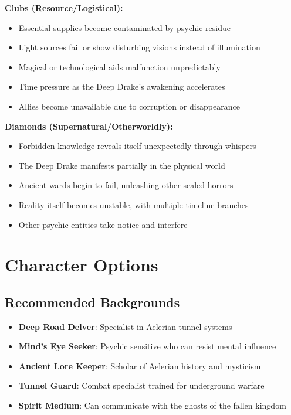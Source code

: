 \documentclass[11pt]{article}
\begin{document}
\textbf{Clubs (Resource/Logistical):}
\begin{itemize}
\item Essential supplies become contaminated by psychic residue
\item Light sources fail or show disturbing visions instead of illumination
\item Magical or technological aids malfunction unpredictably
\item Time pressure as the Deep Drake's awakening accelerates
\item Allies become unavailable due to corruption or disappearance
\end{itemize}

\textbf{Diamonds (Supernatural/Otherworldly):}
\begin{itemize}
\item Forbidden knowledge reveals itself unexpectedly through whispers
\item The Deep Drake manifests partially in the physical world
\item Ancient wards begin to fail, unleashing other sealed horrors
\item Reality itself becomes unstable, with multiple timeline branches
\item Other psychic entities take notice and interfere
\end{itemize}

\section{Character Options}

\subsection{Recommended Backgrounds}

\begin{itemize}
\item \textbf{Deep Road Delver}: Specialist in Aelerian tunnel systems
\item \textbf{Mind's Eye Seeker}: Psychic sensitive who can resist mental influence
\item \textbf{Ancient Lore Keeper}: Scholar of Aelerian history and mysticism
\item \textbf{Tunnel Guard}: Combat specialist trained for underground warfare
\item \textbf{Spirit Medium}: Can communicate with the ghosts of the fallen kingdom
\end{itemize}
\end{document}
